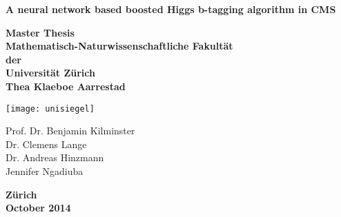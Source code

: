 \thispagestyle{empty}
\begin{center}
 \vspace{6mm}
 {\LARGE\bf A neural network based boosted Higgs b-tagging algorithm in CMS \\}
\end{center}
\hrulefill

\vspace{8mm}

\begin{center}
 {\Large\bf Master Thesis \\}
 \vspace{4mm}
 {\large\bf Mathematisch-Naturwissenschaftliche Fakultät \\}
 {\large\bf der \\}
 \vspace{2mm}
 {\Large\bf Universität Zürich\\}
 \vspace{8mm}
 {\Large\bf  Thea Klaeboe Aarrestad\\}
\end{center}

\vspace{8mm}

  \begin{center}
    \texttt{[image: unisiegel]}
  \end{center}

\vspace{8mm}

\begin{center}
\vspace{3mm}
 {\large Prof. Dr. Benjamin Kilminster\\}
 {\large Dr. Clemens Lange\\}
 {\large Dr. Andreas Hinzmann\\}
 {\large Jennifer Ngadiuba\\}
\end{center}

\vspace{8mm}

\begin{center}
 {\large\bf Zürich\\ October 2014 \\}
\end{center}

\cleardoublepage
\endinput